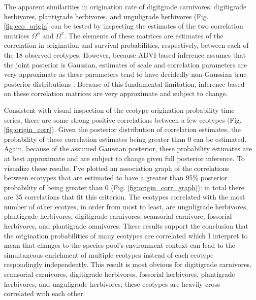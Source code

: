 \documentclass[12pt,letterpaper]{article}
\begin{document}
The apparent similarities in origination rate of digitgrade carnivores, digitigrade herbivores, plantigrade herbivores, and unguligrade herbivores (Fig. \ref{fig:eco_origin} can be tested by inspecting the estimates of the two correlation matrices \(\Omega^{\phi}\) and \(\Omega^{\pi}\). The elements of these matrices are estimates of the correlation in origination and survival probabilities, respectively, between each of the 18 observed ecotypes. However, because ADVI-based inference assumes that the joint posterior is Gaussian, estimates of scale and correlation parameters are very approximate as these parameters tend to have decidedly non-Gaussian true posterior distributions \citep{Gelman2013d}. Because of this fundamental limitation, inference based on these correlation matrices are very approximate and subject to change.

Consistent with visual inspection of the ecotype origination probability time series, there are some strong positive correlations between a few ecotypes (Fig. \ref{fig:origin_corr}). Given the posterior distribution of correlation estimates, the probability of these correlation estimates being greater than 0 can be estimated. Again, because of the assumed Gaussian posterior, these probability estimates are at best approximate and are subject to change given full posterior inference. To visualize these results, I've plotted an association graph of the correlations between ecotypes that are estimated to have a greater than 95\% posterior probability of being greater than 0 (Fig. \ref{fig:origin_corr_graph}); in total there are 35 correlations that fit this criterion. The ecotypes correlated with the most number of other ecotyes, in order from most to least, are unguligrade herbivores, plantigrade herbivores, digitigrade carnivores, scansorial carnivore, fossorial herbivores, and plantigrade omnivores. These results support the conclusion that the origination probabilities of many ecotypes are correlated which I interpret to mean that changes to the species pool's environment context can lead to the simultaneous enrichment of multiple ecotypes instead of each ecotype respondingly independently. This result is most obvious for digitigrade carnivores, scansorial carnivores, digitigrade herbivores, fossorial herbivores, plantigrade herbivores, and unguligrade herbivores; these ecotypes are heavily cross-correlated with each other.
\end{document}

